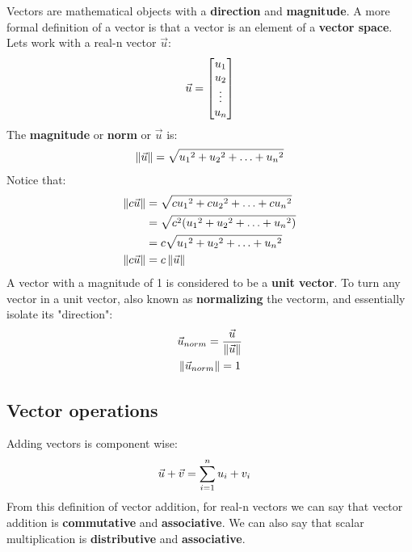 \documentclass[../main.tex]{subfiles}
\begin{document}
Vectors are mathematical objects with a \textbf{direction} and \textbf{magnitude}. A more formal definition of a vector is that a vector is an element of a \textbf{vector space}. \\ 

\noindent
Lets work with a real-n vector $\vec{u}$:
\begin{align}
	\vec{u} = \begin{bmatrix}
			u_1 \\
			u_2 \\
			\vdots \\
			u_n
		\end{bmatrix} \notag
\end{align}
\noindent
The \textbf{magnitude} or \textbf{norm} or $\vec{u}$ is:
\begin{align}
	\left\lVert\vec{u}\right\rVert = \sqrt{{u_1}^2 + {u_2}^2 + \hdots + {u_n}^2} \notag
\end{align}
\noindent
Notice that:
\begin{align}
	\left\lVert c\vec{u}\right\rVert &= \sqrt{{cu_1}^2 + {cu_2}^2 + \hdots + {cu_n}^2} \notag \\
			&= \sqrt{c^{2}({u_1}^2 + {u_2}^2 + \hdots + {u_n}^{2})} \notag \\
			&= c\sqrt{{u_1}^2 + {u_2}^2 + \hdots + {u_n}^2} \notag \\
	\left\lVert c\vec{u}\right\rVert &= c\left\lVert\vec{u}\right\rVert \notag 
\end{align}
A vector with a magnitude of 1 is considered to be a \textbf{unit vector}. To turn any vector in a unit vector, also known as \textbf{normalizing} the vectorm, and essentially isolate its "direction":
\begin{align}
	&\vec{u}_{norm} = \frac{\vec{u}}{\left\lVert\vec{u}\right\rVert} \notag \\
	&\left\lVert\vec{u}_{norm}\right\rVert = 1 \notag
\end{align}

\subsection{Vector operations}
Adding vectors is component wise:
\begin{align}
	\vec{u} + \vec{v} &= \sum_{i=1}^{n} u_i + v_i \notag
\end{align}
\noindent
From this definition of vector addition, for real-n vectors we can say that vector addition is \textbf{commutative} and \textbf{associative}. We can also say that scalar multiplication is \textbf{distributive} and \textbf{associative}. \\
\end{document}
